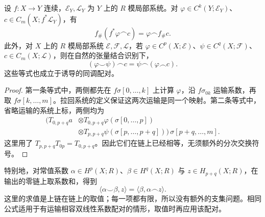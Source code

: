 \begin{proposition}\label{g2:prop:cap-naturality}
	设 \(f:X\to Y\) 连续，\(\mathcal E_Y,\mathcal L_Y\) 为 \(Y\) 上的 \(R\) 模局部系统。对 \(\varphi\in C^k(Y;\mathcal E_Y)\)、\(c\in C_m(X;f^*\mathcal L_Y)\)，有
	\[
		f_\#(f^*\varphi\frown c)=\varphi\frown f_\#c.
	\]
	此外，对 \(X\) 上的 \(R\) 模局部系统 \(\mathcal E,\mathcal F,\mathcal L\)，若 \(\varphi\in C^p(X;\mathcal E)\)、\(\psi\in C^q(X;\mathcal F)\)、\(c\in C_m(X;\mathcal L)\)，则在自然的张量结合识别下，
	\begin{equation}\label{g2:eq:cup-cap-associativity}
		(\varphi\smile\psi)\frown c
		=\psi\frown(\varphi\frown c).
	\end{equation}
	这些等式也成立于诱导的同调配对。
\end{proposition}
\begin{proof}
	第一条等式中，两侧都先在 \(f\sigma[0,\ldots,k]\) 上计算 \(\varphi\)，沿 \(f\sigma_{0k}\) 运输系数，再取 \(f\sigma[k,\ldots,m]\)。拉回系统的定义保证这两次运输是同一个映射。第二条等式中，省略运输的系统上标，两侧均为
	\[
		\begin{aligned}
			\bigl(T_{0,p+q}a&\otimes T_{0,p+q}\varphi(\sigma[0,\ldots,p])\\
			&\otimes T_{p,p+q}\psi(\sigma[p,\ldots,p+q])\bigr)\,\sigma[p+q,\ldots,m].
		\end{aligned}
	\]
	这里用了 \(T_{p,p+q}T_{0p}=T_{0,p+q}\)。因此它们在链上已经相等，无须额外的分次交换符号。
\end{proof}

特别地，对常值系数 \(\alpha\in H^p(X;R)\)、\(\beta\in H^q(X;R)\) 与 \(z\in H_{p+q}(X;R)\)，在输出的零链上取系数和，得到
\begin{equation}\label{g2:eq:cap-evaluation}
	\langle\alpha\smile\beta,z\rangle
	=\langle\beta,\alpha\frown z\rangle.
\end{equation}
这里的求值是上链在链上的取值；每一项都有限，所以没有额外的支集问题。相同公式适用于有运输相容双线性系数配对的情形，取值时再应用该配对。

